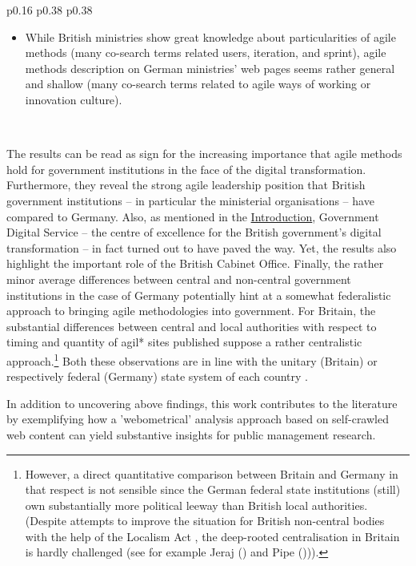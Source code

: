 \begin{spacing}{.9}
\begin{longtable}[ht!]{p{0.16\textwidth} p{0.38\textwidth} p{0.38\textwidth}}
{\begin{minipage}[t]{\linewidth}
\begin{itemize}[nosep, wide=0pt, leftmargin=*, after=\strut]
    \item While British ministries show great knowledge about particularities of agile methods (many co-search terms related users, iteration, and sprint), agile methods description on German ministries' web pages seems rather general and shallow (many co-search terms related to agile ways of working or innovation culture).
    \end{itemize}
    \end{minipage}}\\
    \hline
\end{longtable}
\end{spacing}
\endgroup
\vspace{-0.1cm}


The results can be read as sign for the increasing importance that agile methods hold for government institutions in the face of the digital transformation. Furthermore, they reveal the strong agile leadership position that British government institutions – in particular the ministerial organisations – have compared to Germany. Also, as mentioned in the \hyperref[Introduction]{Introduction}, Government Digital Service – the centre of excellence for the British government's digital transformation – in fact turned out to have paved the way. Yet, the results also highlight the important role of the British Cabinet Office. Finally, the rather minor average differences between central and non-central government institutions in the case of Germany potentially hint at a somewhat federalistic approach to bringing agile methodologies into government. For Britain, the substantial differences between central and local authorities with respect to timing and quantity of agil* sites published suppose a rather centralistic approach.\footnote{However, a direct quantitative comparison between Britain and Germany in that respect is not sensible since the German federal state institutions (still) own substantially more political leeway than British local authorities. (Despite attempts to improve the situation for British non-central bodies with the help of the Localism Act \parencite{Legislation.gov.uk2011}, the deep-rooted centralisation in Britain is hardly challenged (see for example Jeraj (\cite*{Jeraj2013}) and Pipe (\cite*{ Pipe2013}))).} Both these observations are in line with the unitary (Britain) or respectively federal (Germany) state system of each country \parencite{Elazar1997}. 

In addition to uncovering above findings, this work contributes to the literature by exemplifying how a 'webometrical' analysis approach \parencite{Thelwall2009} based on self-crawled web content can yield substantive insights for public management research. 

